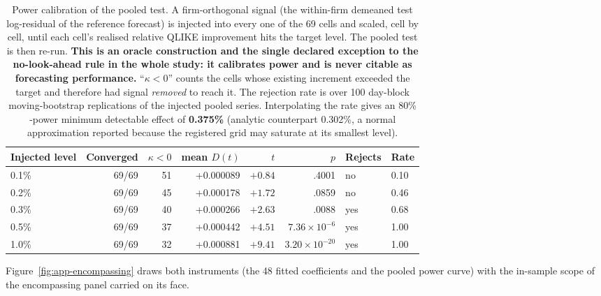\begin{table}[htbp]
\centering
\caption[Power calibration of the pooled omnibus test]{Power calibration of
the pooled test. A firm-orthogonal signal (the within-firm demeaned test
log-residual of the reference forecast) is injected into every one of
the 69 cells and scaled, cell by cell, until each cell's realised relative
QLIKE improvement hits the target level. The pooled test is then re-run.
\textbf{This is an oracle construction and the single declared exception to
the no-look-ahead rule in the whole study: it calibrates power and is never
citable as forecasting performance.} ``$\kappa<0$'' counts the cells whose
existing increment exceeded the target and therefore had signal
\emph{removed} to reach it. The rejection rate is over 100 day-block
moving-bootstrap replications of the injected pooled series. Interpolating
the rate gives an 80\% -power minimum detectable effect of \textbf{0.375\%}
(analytic counterpart 0.302\%, a normal approximation reported because the
registered grid may saturate at its smallest level).}
\label{tab:app-power}
\singlespacing\small
\setlength{\tabcolsep}{4pt}
\begin{tabular}{@{}lrrrrrll@{}}
\toprule
Injected level & Converged & $\kappa<0$ & mean $D(t)$ & $t$ & $p$ & Rejects & Rate \\
\midrule
0.1\% & 69/69 & 51 & +0.000089 & $+0.84$ & .4001 & no & 0.10 \\
0.2\% & 69/69 & 45 & +0.000178 & $+1.72$ & .0859 & no & 0.46 \\
0.3\% & 69/69 & 40 & +0.000266 & $+2.63$ & .0088 & yes & 0.68 \\
0.5\% & 69/69 & 37 & +0.000442 & $+4.51$ & $7.36\times10^{-6}$ & yes & 1.00 \\
1.0\% & 69/69 & 32 & +0.000881 & $+9.41$ & $3.20\times10^{-20}$ & yes & 1.00 \\
\bottomrule
\end{tabular}
\end{table}

Figure~\ref{fig:app-encompassing} draws both
instruments (the 48 fitted coefficients and the pooled power curve) with the
in-sample scope of the encompassing panel carried on its face.


\clearpage

